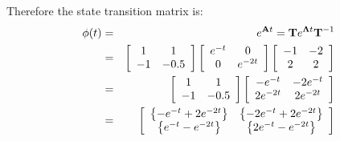 Therefore the state transition matrix is:
\begin{eqnarray*}
\mathbf{\phi}(t) & = & e^{\mathbf{A}t}=\mathbf{T}e^{\mathbf{\Lambda}t}\mathbf{T}^{-1} \\
	             & = & \left[ {\begin{array}{*{20}c}
	   1 & 1  \\
	   { - 1} & { - 0.5}  \\
	\end{array}} \right]\left[ {\begin{array}{*{20}c}
	   {e^{ - t} } & 0  \\
	   0 & {e^{ - 2t} }  \\
	\end{array}} \right]\left[ {\begin{array}{*{20}c}
	   { - 1} & { - 2}  \\
	   2 & 2  \\
	\end{array}} \right] \\
	             & = & \left[ {\begin{array}{*{20}c}
	   1 & 1  \\
	   { - 1} & { - 0.5}  \\
	\end{array}} \right]\left[ {\begin{array}{*{20}c}
	   {-e^{ - t} } & {-2e^{ - t} }  \\
	   {2e^{ - 2t} } & {2e^{ - 2t} }  \\
	\end{array}} \right] \\
	             & = & \left[ {\begin{array}{*{20}c}
	   \left\{ {-e^{ - t} + 2e^{-2t}} \right\} & \left\{ {-2e^{ - t} + 2e^{-2t}} \right\}  \\
	   \left\{ {e^{ - t} - e^{-2t}} \right\} & \left\{ {2e^{ - t} - e^{-2t}} \right\}  \\
	\end{array}} \right] \\
\end{eqnarray*}

